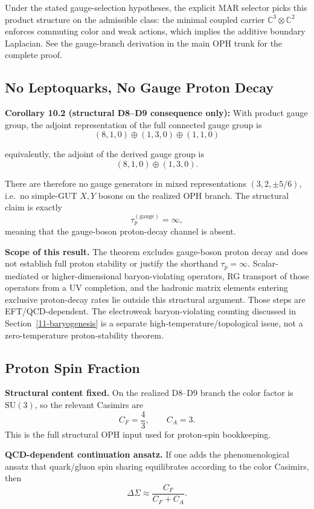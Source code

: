 Under the stated gauge-selection hypotheses, the explicit MAR selector picks this product structure on the admissible class: the minimal coupled carrier \(\mathbb{C}^3 \otimes \mathbb{C}^2\) enforces commuting color and weak actions, which implies the additive boundary Laplacian. See the gauge-branch derivation in the main OPH trunk for the complete proof.

\subsection{No Leptoquarks, No Gauge Proton Decay}\label{102-no-leptoquarks-no-gauge-proton-decay}

\textbf{Corollary 10.2 (structural D8--D9 consequence only):} With product gauge group, the adjoint representation of the full connected gauge group is \[(8,1,0) \oplus (1,3,0) \oplus (1,1,0)\]

equivalently, the adjoint of the derived gauge group is
\[
(8,1,0) \oplus (1,3,0).
\]

There are therefore no gauge generators in mixed representations \((3,2,\pm 5/6)\), i.e.\ no simple-GUT \(X,Y\) bosons on the realized OPH branch. The structural claim is exactly
\[
\tau_p^{(\text{gauge})} = \infty,
\]
meaning that the gauge-boson proton-decay channel is absent.

\textbf{Scope of this result.} The theorem excludes gauge-boson proton decay and does not establish full proton stability or justify the shorthand \(\tau_p=\infty\). Scalar-mediated or higher-dimensional baryon-violating operators, RG transport of those operators from a UV completion, and the hadronic matrix elements entering exclusive proton-decay rates lie outside this structural argument. Those steps are EFT/QCD-dependent. The electroweak baryon-violating counting discussed in Section~\ref{11-baryogenesis} is a separate high-temperature/topological issue, not a zero-temperature proton-stability theorem.

\subsection{Proton Spin Fraction}\label{103-proton-spin-fraction}

\textbf{Structural content fixed.} On the realized D8--D9 branch the color factor is \(\mathrm{SU}(3)\), so the relevant Casimirs are
\[
C_F=\frac43,\qquad C_A=3.
\]
This is the full structural OPH input used for proton-spin bookkeeping.

\textbf{QCD-dependent continuation ansatz.} If one adds the phenomenological ansatz that quark/gluon spin sharing equilibrates according to the color Casimirs, then
\[
\Delta\Sigma \approx \frac{C_F}{C_F + C_A}.
\]

